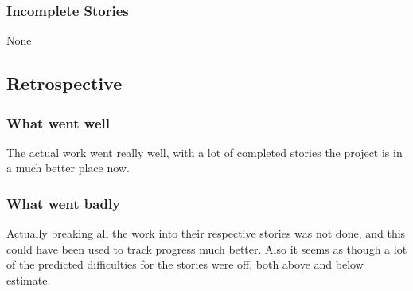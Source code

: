 \subsubsection{Incomplete Stories}
None

\subsection{Retrospective}
\subsubsection{What went well}
The actual work went really well, with a lot of completed stories the project is in a much better place now.
\subsubsection{What went badly}
Actually breaking all the work into their respective stories was not done, and this could have been used to track progress much better. Also it seems as though a lot of the predicted difficulties for the stories were off, both above and below estimate.
\newpage
